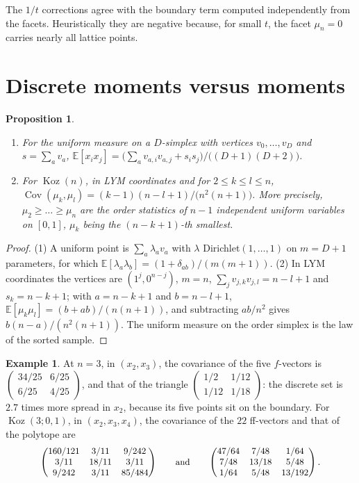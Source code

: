\documentclass[11pt, a4paper, abstract=yes]{scrartcl}
\theoremstyle{definition}
\newtheorem{mexample}[definition]{Example}
\theoremstyle{remark}
\theoremstyle{plain}
\newtheorem{proposition}[definition]{Proposition}
\theoremstyle{remark}
\theoremstyle{plain}
\newcommand{\Koz}{\operatorname{Koz}}
\newcommand{\leannone}{\tikz[baseline=-0.6ex]\draw[leannone,line width=0.6pt] (0,0) circle (0.55ex);}
\newcommand{\leanmark}[1]{\leavevmode{\reversemarginpar\marginnote{\raggedleft#1}}}
\begin{document}
The \(1/t\) corrections agree with the boundary term computed independently from the facets.
Heuristically they are negative because, for small \(t\), the facet \(\mu_n=0\) carries nearly all
lattice points.
\section{Discrete moments versus moments}
\label{sec-moments}
\begin{proposition}
\begin{enumerate}
\item \leanmark{\leannone}For the uniform measure on a \(D\)-simplex with vertices \(v_0,\dots,v_D\) and \(s=\sum_av_a\),
\(\mathbb E[x_ix_j]=\bigl(\sum_av_{a,i}v_{a,j}+s_is_j\bigr)/\bigl((D+1)(D+2)\bigr)\).
\item For \(\Koz(n)\), in LYM coordinates and for \(2\le k\le l\le n\),
\(\operatorname{Cov}(\mu_k,\mu_l)=(k-1)(n-l+1)/\bigl(n^2(n+1)\bigr)\). More precisely,
\(\mu_2\ge\dots\ge\mu_n\) are the order statistics of \(n-1\) independent uniform variables on
\([0,1]\), \(\mu_k\) being the \((n-k+1)\)-th smallest.
\end{enumerate}
\label{prop-second-moments}
\end{proposition}

\begin{proof}
(1) A uniform point is \(\sum_a\lambda_av_a\) with \(\lambda\) Dirichlet\((1,\dots,1)\) on
\(m=D+1\) parameters, for which \(\mathbb E[\lambda_a\lambda_b]=(1+\delta_{ab})/(m(m+1))\). (2) In LYM
coordinates the vertices are \((1^j,0^{n-j})\), \(m=n\), \(\sum_jv_{j,k}v_{j,l}=n-l+1\) and
\(s_k=n-k+1\); with \(a=n-k+1\) and \(b=n-l+1\),
\(\mathbb E[\mu_k\mu_l]=(b+ab)/(n(n+1))\), and subtracting \(ab/n^2\) gives \(b(n-a)/(n^2(n+1))\). The
uniform measure on the order simplex is the law of the sorted sample.
\end{proof}

\begin{mexample}
At \(n=3\), in \((x_2,x_3)\), the covariance of the five \(f\)-vectors is
\(\left(\begin{smallmatrix}34/25&6/25\\6/25&4/25\end{smallmatrix}\right)\), and that of the triangle
\(\left(\begin{smallmatrix}1/2&1/12\\1/12&1/18\end{smallmatrix}\right)\): the discrete set is
\(2.7\) times more spread in \(x_2\), because its five points sit on the boundary. For
\(\Koz(3;0,1)\), in \((x_2,x_3,x_4)\), the covariance of the \(22\) ff-vectors and that of the polytope
are
\[\small
\begin{pmatrix}160/121&3/11&9/242\\3/11&18/11&3/11\\9/242&3/11&85/484\end{pmatrix}
\qquad\text{and}\qquad
\begin{pmatrix}47/64&7/48&1/64\\7/48&13/18&5/48\\1/64&5/48&13/192\end{pmatrix}.
\]
\label{ex-moments-n3}
\end{mexample}
\end{document}
